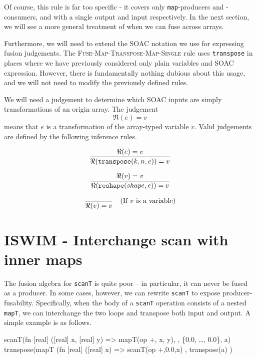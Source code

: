 Of course, this rule is far too specific - it covers only
\texttt{map}-producers and -consumers, and with a single output and
input respectively.  In the next section, we will see a more general
treatment of when we can fuse across arrays.

Furthermore, we will need to extend the SOAC notation we use for
expressing fusion judgements.  The
\textsc{Fuse-Map-Transpose-Map-Single} rule uses \texttt{transpose} in
places where we have previously considered only plain variables and
SOAC expression.  However, there is fundamentally nothing dubious
about this usage, and we will not need to modify the previously
defined rules.

We will need a judgement to determine which SOAC inputs are simply
transformations of an origin array.  The judgement
\[
\boxed{
  \Re(e) = v
}
\]
means that $e$ is a transformation of the array-typed variable $v$.
Valid judgements are defined by the following inference rules.

\begin{align*}
\frac{\displaystyle{
  \Re(e) = v
}}{\displaystyle{
  \Re(\texttt{transpose}(k,n,e)) = v
}}
\end{align*}

\begin{align*}
\frac{\displaystyle{
  \Re(v) = v
}}{\displaystyle{
  \Re(\texttt{reshape}(shape,e)) = v
}}
\end{align*}

\begin{align*}
  \frac{\displaystyle{
  }}{\displaystyle{
    \Re(v) = v
}} \quad (\mbox{If $v$ is a variable})
\end{align*}

\section{ISWIM - Interchange scan with inner maps}

The fusion algebra for \texttt{scanT} is quite poor -- in particular,
it can never be fused as a producer.  In some cases, however, we can
rewrite \texttt{scanT} to expose producer-fusability.  Specifically,
when the body of a \texttt{scanT} operation consists of a nested
\texttt{mapT}, we can interchange the two loops and transpose both
input and output.  A simple example is as follows.

\begin{colorcode}
scanT(fn [real] ([real] x, [real] y) =>
        mapT(op +, x, y),
     , \{0.0, \ldots, 0.0\}, a)   \emphh{\mymath{\equiv}}
transpose(mapT (fn [real] ([real] x) =>
                  scanT(op +,0.0,x)
               , transpose(a) )
\end{colorcode}

